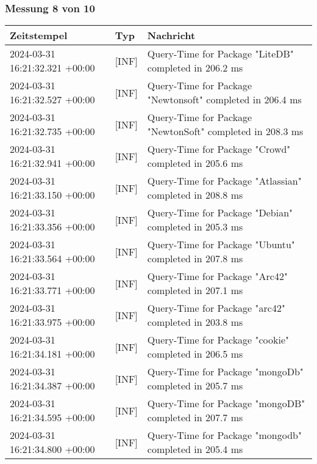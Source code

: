     \subsubsection{Messung 8 von 10} \label{subsubsec:MySQLOhneIndex8von10}
        {
            {\small
                \begin{tabularx}{\textwidth}{|l|l|X|}
                    \hline
                    \textbf{Zeitstempel} & \textbf{Typ} & \textbf{Nachricht} \\
                    \hline
                    \endhead
                    2024-03-31 16:21:32.321 +00:00 & [INF] & Query-Time for Package "LiteDB" completed in 206.2 ms \\
                    2024-03-31 16:21:32.527 +00:00 & [INF] & Query-Time for Package "Newtonsoft" completed in 206.4 ms \\
                    2024-03-31 16:21:32.735 +00:00 & [INF] & Query-Time for Package "NewtonSoft" completed in 208.3 ms \\
                    2024-03-31 16:21:32.941 +00:00 & [INF] & Query-Time for Package "Crowd" completed in 205.6 ms \\
                    2024-03-31 16:21:33.150 +00:00 & [INF] & Query-Time for Package "Atlassian" completed in 208.8 ms \\
                    2024-03-31 16:21:33.356 +00:00 & [INF] & Query-Time for Package "Debian" completed in 205.3 ms \\
                    2024-03-31 16:21:33.564 +00:00 & [INF] & Query-Time for Package "Ubuntu" completed in 207.8 ms \\
                    2024-03-31 16:21:33.771 +00:00 & [INF] & Query-Time for Package "Arc42" completed in 207.1 ms \\
                    2024-03-31 16:21:33.975 +00:00 & [INF] & Query-Time for Package "arc42" completed in 203.8 ms \\
                    2024-03-31 16:21:34.181 +00:00 & [INF] & Query-Time for Package "cookie" completed in 206.5 ms \\
                    2024-03-31 16:21:34.387 +00:00 & [INF] & Query-Time for Package "mongoDb" completed in 205.7 ms \\
                    2024-03-31 16:21:34.595 +00:00 & [INF] & Query-Time for Package "mongoDB" completed in 207.7 ms \\
                    2024-03-31 16:21:34.800 +00:00 & [INF] & Query-Time for Package "mongodb" completed in 205.4 ms \\

\end{tabularx}}}
